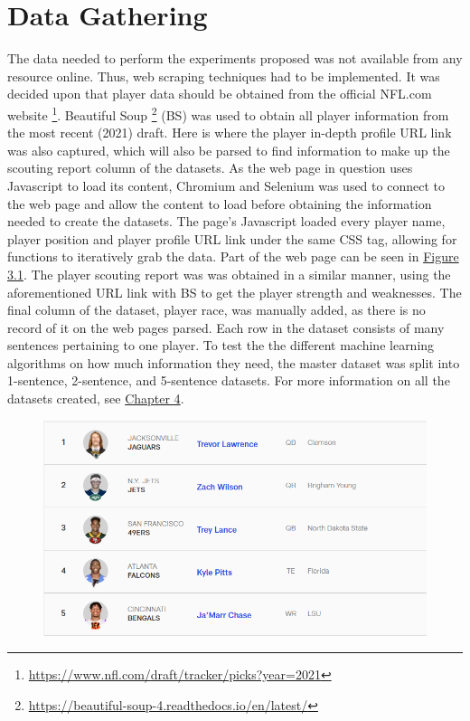 \documentclass[oneside,12pt]{Classes/RoboticsLaTeX}
\begin{document}
\section{Data Gathering}
The data needed to perform the experiments proposed was not available from any resource online. Thus, web scraping techniques had to be implemented. It was decided upon that player data should
be obtained from the official NFL.com website \footnote{\url{https://www.nfl.com/draft/tracker/picks?year=2021}}. Beautiful Soup \footnote{\url{https://beautiful-soup-4.readthedocs.io/en/latest/}} (BS)
was used to obtain all player information from the most recent (2021) draft. Here is where the player in-depth profile URL link was also captured, which will also be parsed to find information to
make up the scouting report column of the datasets. As the web page in question uses Javascript to load its content, Chromium and Selenium was used to connect to the web page and allow the content to load before obtaining the information
needed to create the datasets. The page's Javascript loaded every player name, player position and player profile URL link under the same CSS tag, allowing for functions to iteratively grab the data. Part of the web page
can be seen in \hyperref[fig:NFL_draft]{Figure 3.1}.
The player scouting report was was obtained in a similar manner, using the aforementioned URL link with BS to get the player strength and weaknesses. The final column of the dataset, player race, 
was manually added, as there is no record of it on the web pages parsed. Each row in the dataset consists of many sentences pertaining to one player. To test the the different machine learning algorithms 
on how much information they need, the master dataset was split into 1-sentence, 2-sentence, and 5-sentence datasets. For more information on all the datasets created, see \hyperref[sec:class_data]{Chapter 4}.

\begin{figure}[hb]
  \centering
  \begin{minipage}{1\textwidth}
    \centering
    \includegraphics[width=1\linewidth]{Figures/NFLcom_example.png}
    \label{fig:NFL_draft}
  \end{minipage}%
\end{figure}
\end{document}
